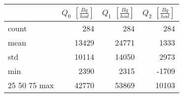 \begin{tabular}{lrrr}
\toprule
{} &  $Q_0$ $\left[\si{\frac{Bq}{hod}}\right]$ &  $Q_1$ $\left[\si{\frac{Bq}{hod}}\right]$ &  $Q_2$ $\left[\si{\frac{Bq}{hod}}\right]$ \\
\midrule
count &                                       284 &                                       284 &                                       284 \\
mean  &                                     13429 &                                     24771 &                                      1333 \\
std   &                                     10114 &                                     14050 &                                      2973 \\
min   &                                      2390 &                                      2315 &                                     -1709 \\
25%
50%
75%
max   &                                     42770 &                                     53869 &                                     10103 \\
\bottomrule
\end{tabular}
